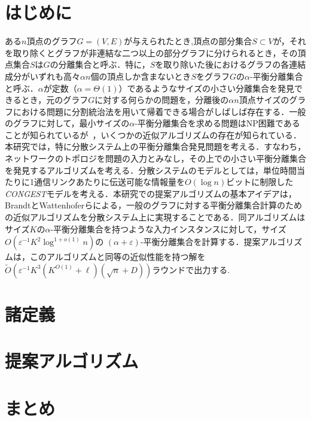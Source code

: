 \documentclass[a4j,twoside]{jarticle}
\begin{document}
\twocolumn[\vspace*{9mm}]     %
\begin{論文概要}              %
\setcounter{page}{2}          %

\section{はじめに}
ある$n$頂点のグラフ$G=(V,E)$が与えられたとき,頂点の部分集合$S \subset V$が，それを取り除くとグラフが非連結な二つ以上の部分グラフに分けられるとき，その頂点集合$S$は$G$の分離集合と呼ぶ．特に，$S$を取り除いた後におけるグラフの各連結成分がいずれも高々$\alpha n$個の頂点しか含まないとき$S$をグラフ$G$の$\alpha$-平衡分離集合と呼ぶ．$\alpha$が定数（$\alpha = \Theta(1)$）であるようなサイズの小さい分離集合を発見できるとき，元のグラフ$G$に対する何らかの問題を，分離後の$\alpha n$頂点サイズのグラフにおける問題に分割統治法を用いて帰着できる場合がしばしば存在する．一般のグラフに対して，最小サイズの$\alpha$-平衡分離集合を求める問題はNP困難であることが知られているが~\cite{bui1992finding}，いくつかの近似アルゴリズムの存在が知られている．本研究では，特に分散システム上の平衡分離集合発見問題を考える．すなわち，ネットワークのトポロジを問題の入力とみなし，その上での小さい平衡分離集合を発見するアルゴリズムを考える．分散システムのモデルとしては，単位時間当たりに1通信リンクあたりに伝送可能な情報量を$O(\log n)$ビットに制限した\textit{CONGEST}モデルを考える．本研究での提案アルゴリズムの基本アイデアは，BrandtとWattenhoferらによる，一般のグラフに対する平衡分離集合計算のための近似アルゴリズム\cite{brandt2017approximating}を分散システム上に実現することである．同アルゴリズムはサイズ$K$の$\alpha$-平衡分離集合を持つような入力インスタンスに対して，サイズ$O(\varepsilon^{-1}K^2\log^{1+o(1)}n)$の $(\alpha + \varepsilon)$-平衡分離集合を計算する．提案アルゴリズムは，このアルゴリズムと同等の近似性能を持つ解を$\tilde{O}(\varepsilon^{-1}K^3(K^{O(1)}+\ell)(\sqrt{n}+D))$ラウンドで出力する.

\section{諸定義}

\section{提案アルゴリズム}

\section{まとめ}



\clearpage                       %
\end{論文概要}                   %
\end{document}
